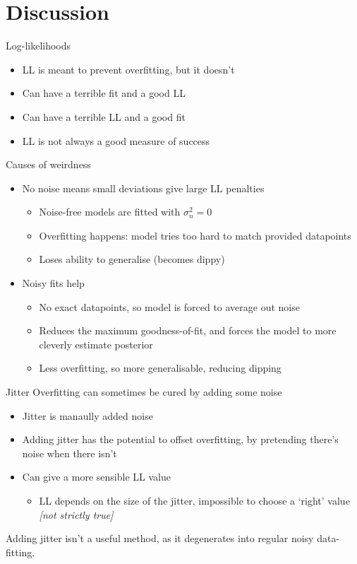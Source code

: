 \documentclass[presentation]{beamer}
\begin{document}
\section{Discussion}
\label{sec:org5e023fd}
\begin{frame}[label={sec:orgf3ffdc8}]{Log-likelihoods}
\begin{itemize}
\item LL is meant to prevent overfitting, but it doesn't
\item Can have a terrible fit and a good LL
\item Can have a terrible LL and a good fit
\item LL is not always a good measure of success
\end{itemize}
\end{frame}

\begin{frame}[label={sec:org739cda7}]{Causes of weirdness}
\begin{itemize}
\item No noise means small deviations give large LL penalties
\begin{itemize}
\item Noise-free models are fitted with \(\sigma_n^2 = 0\)
\item Overfitting happens: model tries too hard to match provided datapoints
\item Loses ability to generalise (becomes dippy)
\vfill
\end{itemize}
\item Noisy fits help
\begin{itemize}
\item No exact datapoints, so model is forced to average out noise
\item Reduces the maximum goodness-of-fit, and forces the model to more cleverly estimate posterior
\item Less overfitting, so more generalisable, reducing dipping
\end{itemize}
\end{itemize}
\end{frame}

\begin{frame}[label={sec:org869c79d}]{Jitter}
Overfitting can sometimes be cured by adding some noise


\vfill

\begin{itemize}
\item Jitter is manaully added noise
\item Adding jitter has the potential to offset overfitting, by pretending there's noise when there isn't
\item Can give a more sensible LL value
\begin{itemize}
\item LL depends on the size of the jitter, impossible to choose a `right' value \emph{[not strictly true]}
\end{itemize}
\end{itemize}

\vfill

Adding jitter isn't a useful method, as it degenerates into regular noisy data-fitting.
\end{frame}
\end{document}
